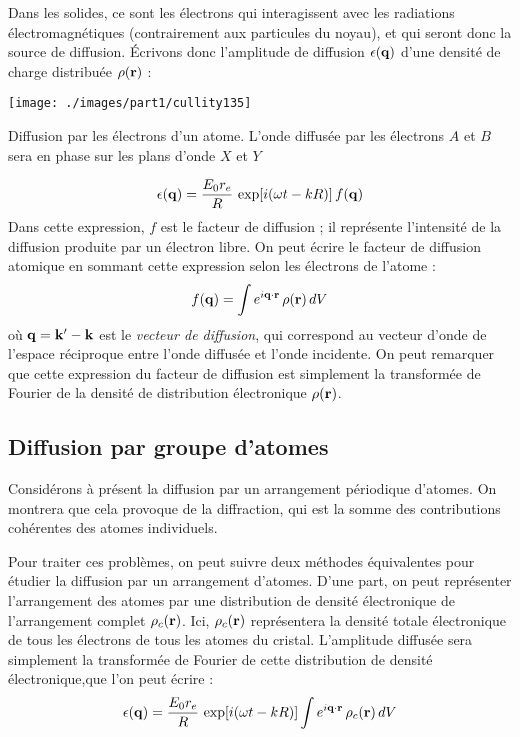 Dans les solides, ce sont les électrons qui interagissent avec les radiations électromagnétiques (contrairement aux particules du noyau), et qui seront donc la source de diffusion. Écrivons donc l'amplitude de diffusion
$\epsilon(\mathbf{q})$ d'une densité de charge distribuée $\rho(\mathbf{r})$ :

\begin{marginfigure}
    \texttt{[image: ./images/part1/cullity135]}
    \caption{Diffusion par les électrons d'un atome. L'onde diffusée par les électrons $A$ et $B$ sera en phase sur les plans d'onde $X$ et $Y$}
\end{marginfigure}

\begin{equation}
    \epsilon(\mathbf{q}) = \frac{E_0 r_e}{R}\, \exp [i(\omega t - k R)]  \, f(\mathbf{q})
\end{equation}
Dans cette expression, $f$ est le facteur de diffusion ; il représente l'intensité de la diffusion produite par un électron libre. On peut écrire le facteur de diffusion atomique en sommant cette expression selon les électrons de l'atome :
\begin{equation}
    f(\mathbf{q}) = \int e^{i\mathbf{q}\cdot\mathbf{r}}\, \rho(\mathbf{r}) \,dV
\end{equation}
où $\mathbf{q = k' - k}$ est le \emph{vecteur de diffusion}, qui correspond au vecteur d'onde de l'espace réciproque entre
l'onde diffusée et l'onde incidente. On peut remarquer que cette expression du facteur de diffusion est simplement la transformée de Fourier de la densité de distribution électronique $\rho(\mathbf{r})$.

\subsection{Diffusion par groupe d'atomes}

Considérons à présent la diffusion par un arrangement périodique d'atomes. On montrera que cela provoque de la diffraction, qui est la somme des contributions cohérentes des atomes individuels.

Pour traiter ces problèmes, on peut suivre deux méthodes équivalentes pour étudier la diffusion par un arrangement d'atomes.
D'une part, on peut représenter l'arrangement des atomes par une distribution de densité électronique de l'arrangement complet $\rho_c(\mathbf{r})$. Ici, $\rho_c(\mathbf{r})$ représentera la densité totale électronique de tous les électrons de tous les atomes du cristal. L'amplitude diffusée sera simplement la transformée de Fourier de cette distribution de densité électronique,que l'on peut écrire :
\begin{equation}
    \epsilon(\mathbf{q}) = \frac{E_0 r_e}{R}\, \exp [i(\omega t - k R)] \int e^{i \mathbf{q \cdot r}} \, \rho_c (\mathbf{r})\, dV
    \label{fftdistrelec}
\end{equation}

